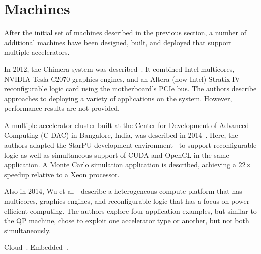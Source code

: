 \section{Machines}
\label{sec:machines}

After the initial set of machines described in the previous section,
a number of additional machines have been designed, built, and deployed
that support multiple accelerators.

In 2012, the Chimera system was described~\cite{ibs12}.
It combined Intel multicores, NVIDIA Tesla C2070 graphics engines,
and an Altera (now Intel) Stratix-IV reconfigurable logic card using
the motherboard's PCIe bus. The authors describe approaches to deploying
a variety of applications on the system. However, performance results
are not provided.

A multiple accelerator cluster built at the Center for Development of
Advanced Computing (C-DAC) in Bangalore, India, was described in
2014~\cite{admb14}. Here, the authors adapted the StarPU development
environment~\cite{starpu} to support reconfigurable logic as well as
simultaneous support of CUDA and OpenCL in the same application.
A Monte Carlo simulation application is described, achieving a 22$\times$
speedup relative to a Xeon processor.

Also in 2014, Wu et al.~\cite{whk+14} describe a heterogeneous compute
platform that has multicores, graphics engines, and reconfigurable logic
that has a focus on power efficient computing.
The authors explore four application examples, but similar to the QP
machine, chose to exploit one accelerator type or another, but not both
simultaneously.

Cloud~\cite{pcc14}.
Embedded~\cite{rpm+15}.
